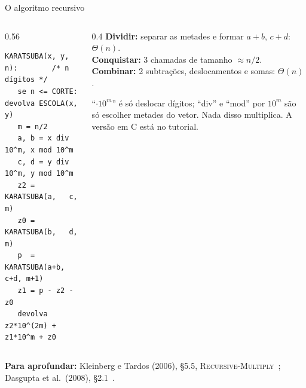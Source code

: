 \documentclass[aspectratio=169,xcolor=table]{beamer}
\newcommand{\fonte}[1]{%
  \vfill
  {\tiny\color{gray!55!black}\textbf{Para aprofundar:} #1\par}%
}
\begin{document}
\begin{frame}[fragile]{O algoritmo recursivo}
  \begin{columns}[T]
    \begin{column}{0.56\textwidth}
\begin{lstlisting}
KARATSUBA(x, y, n):        /* n dígitos */
   se n <= CORTE: devolva ESCOLA(x, y)
   m = n/2
   a, b = x div 10^m, x mod 10^m
   c, d = y div 10^m, y mod 10^m
   z2 = KARATSUBA(a,   c,   m)
   z0 = KARATSUBA(b,   d,   m)
   p  = KARATSUBA(a+b, c+d, m+1)
   z1 = p - z2 - z0
   devolva z2*10^(2m) + z1*10^m + z0
\end{lstlisting}
    \end{column}
    \begin{column}{0.4\textwidth}
      \scriptsize
      \textbf{Dividir:} separar as metades e formar $a+b$, $c+d$: $\Theta(n)$.\\[2pt]
      \textbf{Conquistar:} 3 chamadas de tamanho $\approx n/2$.\\[2pt]
      \textbf{Combinar:} 2 subtrações, deslocamentos e somas: $\Theta(n)$.
      \medskip

      ``$\cdot 10^m$'' é só deslocar dígitos; ``div'' e ``mod'' por $10^m$ são só
      escolher metades do vetor. Nada disso multiplica.
      A versão em C está no tutorial.
    \end{column}
  \end{columns}
  \fonte{Kleinberg e Tardos (2006), \S 5.5, \textsc{Recursive-Multiply}~\cite{kleinberg2006algorithm};
    Dasgupta et al.\ (2008), \S 2.1~\cite{dasgupta2008algorithms}.}
\end{frame}
\end{document}

